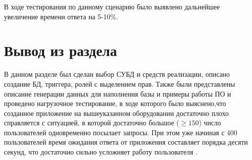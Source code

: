 В ходе тестирования по данному сценарию было выявлено дальнейшее увеличение
времени ответа на 5-10\%.

\newpage
\section{Вывод из раздела}
В данном разделе был сделан выбор СУБД и средств реализации, описано создание БД, триггера, ролей с выделением прав. Также были представлены описание генерации данных для наполнения базы и примеры работы ПО и проведено нагрузочное тестирование, в ходе которого было выяснено,что созданное приложение на вышеуказанном оборудовании достаточно плохо справляется с ситуацией, в которой достаточно большое ($\geq 150$) число пользователей одновременно посылает запросы. При этом уже начиная с 400 пользователей время ожидания ответа от приложения составляет порядка десяти секунд, что достаточно сильно усложняет работу пользователя \cite{attention}.
